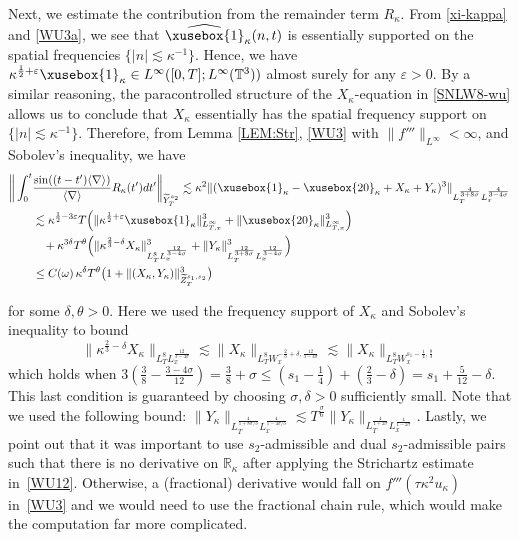 \documentclass[%
11pt,  reqno]{amsart}
\def\<#1>{\xusebox{#1}}
\newcommand{\1}{\hspace{0.2mm}\text{I}\hspace{0.2mm}}
\newcommand{\noi}{\noindent}
\newcommand{\R}{\mathbb{R}}
\newcommand{\T}{\mathbb{T}}
\newcommand{\dl}{\delta}
\newcommand{\nb}{\nabla}
\newcommand{\eps}{\varepsilon}
\newcommand{\kk}{\kappa}
\newcommand{\s}{\sigma}
\newcommand{\ft}{\widehat}
\newcommand{\wt}{\widetilde}
\newcommand{\ta}{\theta}
\renewcommand{\o}{\omega}
\newcommand{\les}{\lesssim}
\newcommand{\jb}[1]
{\langle #1 \rangle}
\numberwithin{equation}{section}
\numberwithin{theorem}{section}
\begin{document}
Next, we estimate the contribution from  the remainder term $R_\kk$.
From \eqref{xi-kappa} and \eqref{WU3a}, 
we see that
 $\ft{\<1>}_\kk(n, t)$  is essentially supported on the spatial frequencies $\{|n|\les \kk^{-1}\}$.
Hence, we have 
$ \kk^{\frac{1}{2}+\eps}\<1>_\kk\in L^\infty([0, T]; L^\infty(\T^3))$
almost surely for any $\eps > 0$.
By a similar reasoning, 
the paracontrolled structure of the $X_\kk$-equation in \eqref{SNLW8-wu}
allows us to conclude that $X_\kk$
essentially has the spatial frequency support on $\{|n|\les \kk^{-1}\}$.
Therefore, 
from Lemma \ref{LEM:Str}, \eqref{WU3} with $\|f'''\|_{L^\infty} < \infty$, 
and Sobolev's inequality, 
we have
\begin{align}
\begin{split}
\bigg\| \int_0^t 
& \frac{\sin((t-t')\jb{\nb})}{\jb{\nb}} 
R_\kk(t') dt'
\bigg\|_{\wt Y^{s_2}_T}
  \les \kk^2\| ( \<1>_\kk - \<20>_\kk + X_\kk + Y_\kk)^3\|_{L^\frac{4}{3+8\s}_{T} L^\frac{4}{3-4\s}_x}\\
& 
\les 
\kk^{\frac{1}{2}-3\eps}T \Big( \| \kk^{\frac{1}{2}+\eps}\<1>_\kk\|^3_{L^\infty_{T, x}}
+ \| \<20>_\kk\|^3_{L^\infty_{T, x}} \Big)\\
& \hphantom{X}
+  \kk^{3\dl} T^\ta\Big( \| \kk^{\frac{2}{3}-\dl} X_\kk\|^3_{L^8_T L^\frac{12}{3-4\s}_x}
+  \| Y_\kk\|^3_{L^\frac{12}{3+8\s}_T L^\frac{12}{3-4\s}_x}\Big)\\
& \le C(\o) \, \kk^{\dl} T^\ta \big( 1 + \|(X_\kk, Y_\kk)\|_{\wt Z^{s_1, s_2}_T}^3 \big)
\end{split}
\label{WU12}
\end{align}


\noi
for some $\dl, \ta >0$. Here we used the frequency  support of $ X_\kk$ and
 Sobolev's inequality to bound
\[
\| \kk^{\frac{2}{3}-\dl} X_\kk\|_{L^8_T L^\frac{12}{3-4\s}_x}  \lesssim
\|  X_\kk\|_{L^8_T W^{- \frac23+\delta,\frac{12}{3-4\s}}_x} \lesssim
\|  X_\kk\|_{L^8_T W^{s_1-\frac14, \frac83 }_x}
\]
which holds when
 $3(\frac{3}{8} - \frac{3-4\s}{12}) 
 = \frac38 + \s \leq  (s_1 - \frac 14 ) + (\frac 23 - \dl) = s_1 + \frac{5}{12}-\dl$. This last condition is guaranteed by choosing $\s, \dl > 0$ sufficiently small. 
 Note that we  used the following bound:
 $ \| Y_\kk\|_{L^\frac{4}{1+8\s/3}_T L^\frac{4}{1-4\s/3}_x} 
 \les T^\frac{\s}{6} \| Y_\kk\|_{L^\frac{4}{1+2\s}_T L^\frac{4}{1-2\s}_x}$.
Lastly, we point out that 
it was important to use $s_2$-admissible
and dual $s_2$-admissible pairs
such that there is no derivative on $\R_\kk$
after applying the Strichartz estimate in~\eqref{WU12}.
Otherwise, a (fractional) derivative would fall on $f'''(\tau \kk^2 u_\kk)$ in~\eqref{WU3}
and we would need to use the fractional chain rule,
which would make the computation far more complicated.
\end{document}

